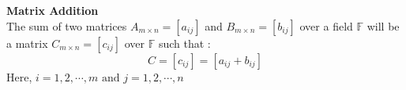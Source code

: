 \documentclass[12pt]{report}
\def\F{{\mathbb F}}
\begin{document}
\begin{defn}
\textbf{Matrix Addition}\\
The sum of two matrices $A_{m\times n}=[a_{ij}]$ and $B_{m\times n}=[b_{ij}]$ over a field $\F$ will be a matrix $C_{m\times n}=[c_{ij}]$ over $\F$ such that :$$C=[c_{ij}]=[a_{ij}+b_{ij}]$$
Here, $i=1,2,\cdots,m \text{ and }  j=1,2,\cdots,n$
\end{defn}
\end{document}
